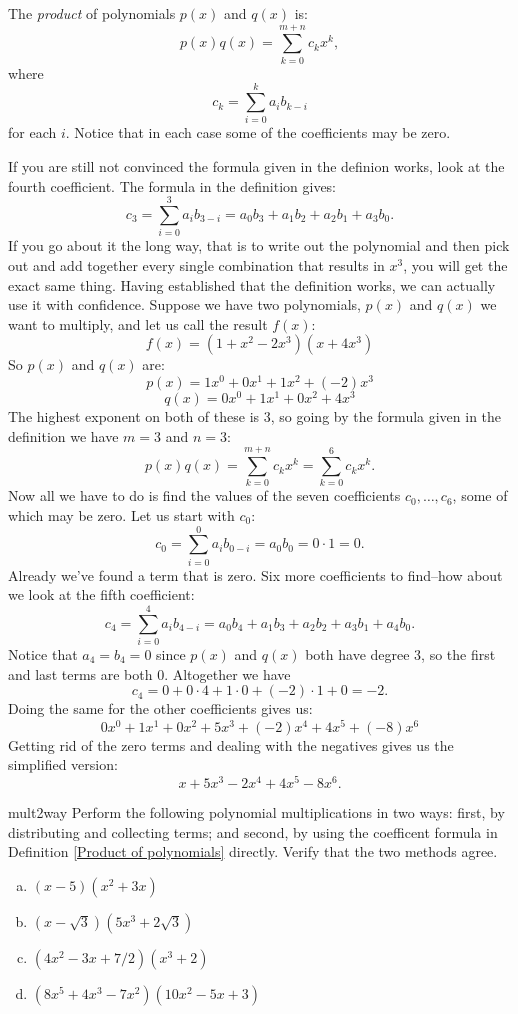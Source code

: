 \begin{defn}\label{Product of polynomials}

The \emph{product} of polynomials $p(x)$ and $q(x)$ is: 
\[
p(x) q(x) = \sum_{k=0}^{m+n} c_k x^k,
\]
where
\[
c_k=  \sum_{i = 0}^k a_i b_{k - i}
\]
for each $i$.  Notice that in each case some of the coefficients may be zero.
\end {defn}

If you are still not convinced the formula given in the definion works, look at the fourth coefficient.  The formula in the definition gives:
\[ c_3 = \sum_{i = 0}^3 a_i b_{3 - i} =  a_0b_3 + a_1b_2 +a_2b_1 + a_3b_0.  \]
If you go about it the long way, that is to write out the polynomial and then pick out and add together every single combination that results in $x^3$, you will get the exact same thing.  Having established that the definition works, we can actually use it with confidence.  Suppose we have two polynomials, $p(x)$ and $q(x)$ we want to multiply, and let us call the result $f(x)$:
\[ f(x)=(1+x^2-2x^3)(x+4x^3) \]
So $p(x)$ and $q(x)$ are:
\[p(x)= 1x^0 + 0x^1 + 1x^2 + (-2)x^3 \]
\[q(x)= 0x^0 + 1x^1 + 0x^2 + 4x^3 \]
The highest exponent on both of these is 3, so going by the formula given in the definition we have $m=3$ and $n=3$:
\[
p(x) q(x) = \sum_{k=0}^{m+n} c_k  x^k =  \sum_{k=0}^{6} c_k x^k. 
\]
Now all we have to do is find the values of the seven coefficients $c_0,\ldots,c_6$, some of which may be zero.  Let us start with $c_0$:
\[ c_0 = \sum_{i = 0}^0 a_i b_{0 - i} = a_0b_0= 0 \cdot 1 = 0. \]
Already we've found a term that is zero.  Six more coefficients to find--how about we look at the fifth coefficient:
\[ c_4 =  \sum_{i = 0}^4 a_i b_{4 - i} =   a_0b_4 + a_1b_3 +a_2b_2 + a_3b_1 + a_4b_0.\]
Notice that $a_4=b_4=0$ since $p(x)$ and $q(x)$ both have degree 3, so the first and last terms are both 0. Altogether we have 
\[ c_4=0+0\cdot 4+1\cdot 0+(-2)\cdot 1+0=-2.\]
Doing the same for the other coefficients gives us:
\[ 0x^0+ 1x^1 + 0x^2 + 5x^3 + (-2)x^4 + 4x^5 + (-8)x^6 \]
Getting rid of the zero terms and dealing with the negatives gives us the simplified version:
\[x+5x^3-2x^4+4x^5-8x^6. \]
\begin {exercise}{mult2way}
Perform the following polynomial multiplications in two ways: first, by distributing and collecting terms; and second, by using the coefficent formula in Definition \ref{Product of polynomials} directly.  Verify that the two methods agree.
\begin {enumerate}[(a)]
\item
$(x-5)(x^2+3x)$
\item
$(x-\sqrt{3})(5x^3+2\sqrt{3})$
\item
$(4x^2 - 3x + 7/2)(x^3+2)$
\item
$(8x^5 + 4x^3 - 7x^2)(10x^2 - 5x + 3)$
\end{enumerate}
\end {exercise}

